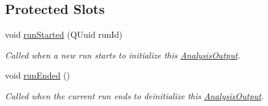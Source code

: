\subsection*{Protected Slots}
\begin{DoxyCompactItemize}
\item 
void \hyperlink{class_picto_1_1_analysis_output_ae7505f86ba3f249ddb6869318987c8f5}{run\-Started} (Q\-Uuid run\-Id)
\begin{DoxyCompactList}\small\item\em Called when a new run starts to initialize this \hyperlink{class_picto_1_1_analysis_output}{Analysis\-Output}. \end{DoxyCompactList}\item 
void \hyperlink{class_picto_1_1_analysis_output_af968d07b76f3c28e7d23b207bb40e2be}{run\-Ended} ()
\begin{DoxyCompactList}\small\item\em Called when the current run ends to deinitialize this \hyperlink{class_picto_1_1_analysis_output}{Analysis\-Output}. \end{DoxyCompactList}\end{DoxyCompactItemize}
